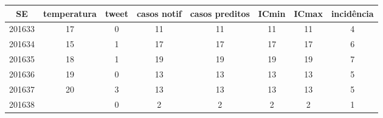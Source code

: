 \begin{tabular}{c|ccccccc}
  \hline
SE & temperatura & tweet & casos notif & casos preditos & ICmin & ICmax & incidência \\ 
  \hline
201633 & 17 & 0 & 11 & 11 & 11 & 11 & 4 \\ 
  201634 & 15 & 1 & 17 & 17 & 17 & 17 & 6 \\ 
  201635 & 18 & 1 & 19 & 19 & 19 & 19 & 7 \\ 
  201636 & 19 & 0 & 13 & 13 & 13 & 13 & 5 \\ 
  201637 & 20 & 3 & 13 & 13 & 13 & 13 & 5 \\ 
  201638 &  & 0 & 2 & 2 & 2 & 2 & 1 \\ 
   \hline
\end{tabular}
